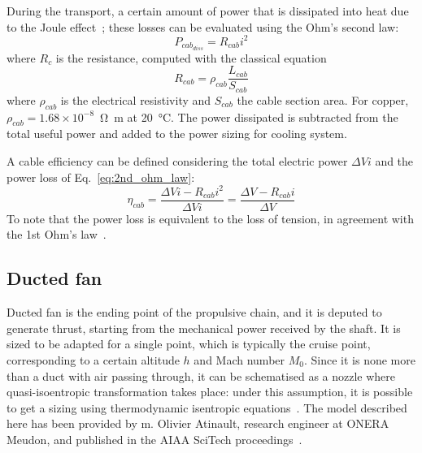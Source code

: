 During the transport, a certain amount of power that is dissipated into heat due to the Joule effect~\cite{bib:tipler}; these losses can be evaluated using the Ohm's second law: 
\begin{equation}
	\label{eq:2nd_ohm_law}
	P_{cab_{diss}} = R_{cab} i^2
\end{equation}
where $R_c$ is the resistance, computed with the classical equation
\begin{equation}
	\label{eq:resistance}
	R_{cab} = \rho_{cab} \frac{L_{cab}}{S_{cab}}
\end{equation}
where $\rho_{cab}$ is the electrical resistivity and $S_{cab}$ the cable section area. 
For copper, $\rho_{cab}=1.68\times10^{-8}$~\si{\ohm\meter} at 20~\si{\celsius}. 
The power dissipated is subtracted from the total useful power and added to the power sizing for cooling system.

A cable efficiency can be defined considering the total electric power $\Delta V i$ and the power loss of Eq.~\eqref{eq:2nd_ohm_law}:
\begin{equation}
	\label{eq:cable_efficiency}
	\eta_{cab} = \frac{\Delta V i - R_{cab}i^2}{\Delta V i} = \frac{\Delta V - R_{cab}i}{\Delta V}
\end{equation}
To note that the power loss is equivalent to the loss of tension, in agreement with the 1st Ohm's law~\cite{bib:tipler}. 

\subsection{Ducted fan}
\label{subsec:chap3_duct_fan_sizing}

Ducted fan is the ending point of the propulsive chain, and it is deputed to generate thrust, starting from the mechanical power received by the shaft. 
It is sized to be adapted for a single point, which is typically the cruise point, corresponding to a certain altitude $h$ and Mach number $M_0$. 
Since it is none more than a duct with air passing through, it can be schematised as a nozzle where quasi-isoentropic transformation takes place: under this assumption, it is possible to get a sizing using thermodynamic isentropic equations~\cite{bib:fermi, bib:carlomagno, bib:landau}.
The model described here has been provided by m. Olivier Atinault, research engineer at ONERA Meudon, and published in the AIAA SciTech proceedings~\cite{bib:sgueglia}.

